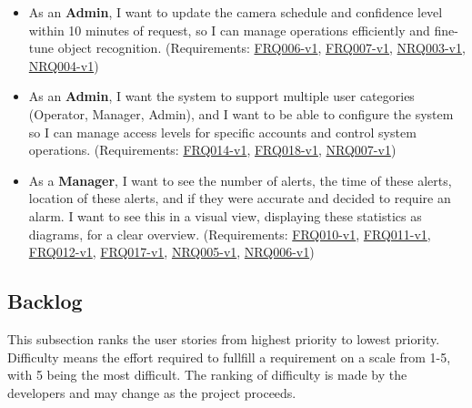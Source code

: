 \documentclass{article}
\begin{document}
\begin{itemize}
    \item As an \textbf{Admin}, I want to update the camera schedule and confidence level within 10 minutes of request, so I can manage operations efficiently and fine-tune object recognition. (Requirements: \hyperlink{FRQ006}{FRQ006-v1}, \hyperlink{FRQ007}{FRQ007-v1}, \hyperlink{NRQ003}{NRQ003-v1}, \hyperlink{NRQ004}{NRQ004-v1})

    \item As an \textbf{Admin}, I want the system to support multiple user categories (Operator, Manager, Admin), and I want to be able to configure the system so I can manage access levels for specific accounts and control system operations. (Requirements: \hyperlink{FRQ014}{FRQ014-v1}, \hyperlink{FRQ018}{FRQ018-v1}, \hyperlink{NRQ007}{NRQ007-v1})

    \item As a \textbf{Manager}, I want to see the number of alerts, the time of these alerts, location of these alerts, and if they were accurate and decided to require an alarm. I want to see this in a visual view, displaying these statistics as diagrams, for a clear overview. (Requirements: \hyperlink{FRQ010}{FRQ010-v1}, \hyperlink{FRQ011}{FRQ011-v1}, \hyperlink{FRQ012}{FRQ012-v1}, \hyperlink{FRQ017}{FRQ017-v1}, \hyperlink{NRQ005}{NRQ005-v1}, \hyperlink{NRQ006}{NRQ006-v1})
    
\end{itemize}

\subsection{Backlog}

This subsection ranks the user stories from highest priority to lowest priority. Difficulty means the effort required to fullfill a requirement on a scale from 1-5, with 5 being the most difficult. The ranking of difficulty is made by the developers and may change as the project proceeds.\\
\end{document}
